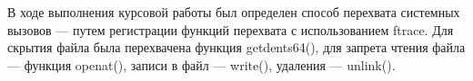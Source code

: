 \Conclusion 

В ходе выполнения курсовой работы был определен способ перехвата системных вызовов --- путем регистрации функций перехвата с использованием ftrace. Для скрытия файла была перехвачена функция getdents64(), для запрета чтения файла --- функция openat(), записи в файл --- write(), удаления --- unlink().